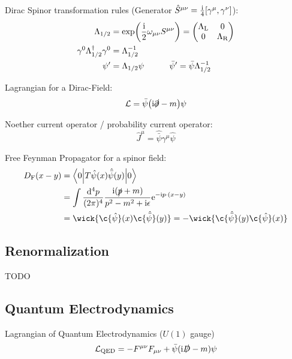 			\noindent
			Dirac Spinor transformation rules (Generator $\hat{S}^{\mu\nu} = \frac{\mathrm{i}}{4}[\gamma^\mu,\gamma^\nu]$):
			\begin{equation}
				\begin{aligned}
					\Lambda_{1/2} &= \exp(\frac{\i}{2}\omega_{\mu\nu}S^{\mu\nu}) = \mqty(\Lambda_\text{L} & 0 \\ 0 & \Lambda_\text{R}) \\
					\gamma^0 \Lambda_{1/2}^\dagger \gamma^0	&= \Lambda_{1/2}^{-1} \\
					\psi' &= \Lambda_{1/2} \psi 
					\hsp \bar{\psi}' = \bar{\psi} \Lambda_{1/2}^{-1} 
				\end{aligned}
			\end{equation}

			\noindent
			Lagrangian for a Dirac-Field:
			\begin{equation}
				\mathcal{L} = \bar{\psi} \qty(\mathrm{i} \slashed{\partial} - m) \psi
			\end{equation}
			
			\noindent
			Noether current operator / probability current operator:
			\begin{equation}
				\hat{J}^\mu = \hat{\bar{\psi}} \gamma^\mu \hat{\psi}
			\end{equation}

			\noindent
			Free Feynman Propagator for a spinor field:
			\begin{equation}
				\begin{aligned}
					D_\text{F}(x-y) &= \mel**{0}{T\hat{\psi}(x)\hat{\bar\psi}(y)}{0} \\
					&= \int \frac{\dd^4 p}{(2\pi)^4} \frac{\i(\slashed{p}+m)}{p^2-m^2+\i\epsilon} \ex^{-\i p\cdot(x-y)} \\
					&= \wick{\c{\hat{\psi}}(x) \c{\hat{\bar{\psi}}}(y)} = - \wick{\c{\hat{\bar{\psi}}}(y) \c{\hat\psi}(x)}
				\end{aligned}
			\end{equation}
			
	\subsection{Renormalization}
		TODO

	\subsection{Quantum Electrodynamics}
		Lagrangian of Quantum Electrodynamics ($U(1)$ gauge)
		\begin{equation}
			\mathcal{L}_\mathrm{QED} = -F^{\mu\nu}F_{\mu\nu} + \bar{\psi}(\mathrm{i}\slashed{D}-m)\psi		
		\end{equation}


